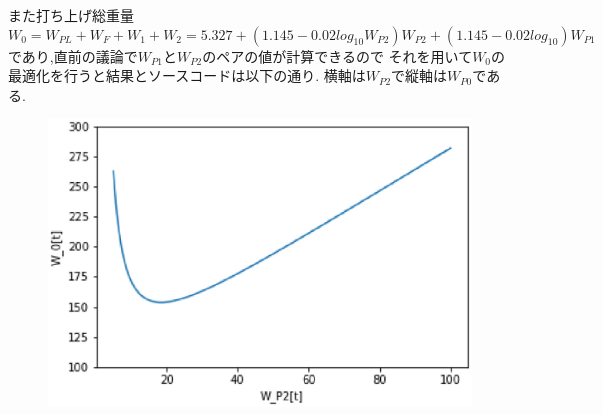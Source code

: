 また打ち上げ総重量
\begin{equation}
W_0 = W_{PL} + W_F + W_1 + W_2
   = 5.327 +(1.145 - 0.02 log_{10} W_{P2})W_{P2} + (1.145 - 0.02 log_{10}) W_{P1}
\end{equation}
であり,直前の議論で$W_{P1}$と$W_{P2}$のペアの値が計算できるので
それを用いて$W_0$の最適化を行うと結果とソースコードは以下の通り.
横軸は$W_{P2}$で縦軸は$W_{P0}$である.

\begin{figure}[H]
\begin{center}
  \includegraphics{saitekika.eps}
\end{center}
\end{figure} \newpage

